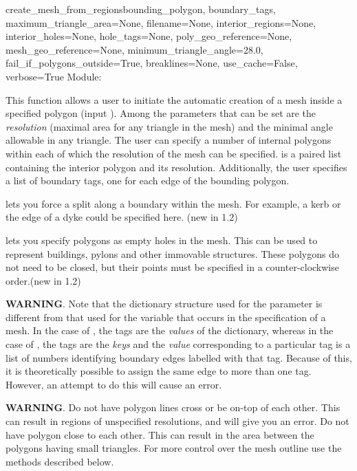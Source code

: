 \documentclass{manual}
\begin{document}
\begin{funcdesc}{create_mesh_from_regions}{bounding_polygon,
                                             boundary_tags,
                                             maximum_triangle_area=None,
                                             filename=None,
                                             interior_regions=None,
                                             interior_holes=None,
                                             hole_tags=None,
                                             poly_geo_reference=None,
                                             mesh_geo_reference=None,
                                             minimum_triangle_angle=28.0,
                                             fail_if_polygons_outside=True,
                                             breaklines=None,
                                             use_cache=False,
                                             verbose=True}
Module: 

This function allows a user to initiate the automatic creation of a
mesh inside a specified polygon (input ).
Among the parameters that can be set are the \emph{resolution}
(maximal area for any triangle in the mesh) and the minimal angle
allowable in any triangle. The user can specify a number of internal
polygons within each of which the resolution of the mesh can be
specified.  is a paired list containing the
interior polygon and its resolution.  Additionally, the user specifies
a list of boundary tags, one for each edge of the bounding polygon.

 lets you force a split along a boundary within the mesh. For
example, a kerb or the edge of a dyke could be specified here. (new in 1.2)

 lets you specify polygons as empty holes in the mesh.
This can be used  to represent buildings, pylons and other immovable
structures. These polygons do not need to be closed, but their points must be
specified in a counter-clockwise order.(new in 1.2)

\textbf{WARNING}. Note that the dictionary structure used for the
parameter  is different from that used for the
variable  that occurs in the specification of a mesh.
In the case of , the tags are the \emph{values} of
the dictionary, whereas in the case of , the
tags are the \emph{keys} and the \emph{value} corresponding to a
particular tag is a list of numbers identifying boundary edges
labelled with that tag. Because of this, it is theoretically
possible to assign the same edge to more than one tag. However, an
attempt to do this will cause an error.

\textbf{WARNING}. Do not have polygon lines cross or be on-top of each
    other. This can result in regions of unspecified resolutions, and \anuga
    will give you an error. Do
    not have polygon close to each other. This can result in the area
    between the polygons having small triangles.  For more control
    over the mesh outline use the methods described below.

\end{funcdesc}
\end{document}
